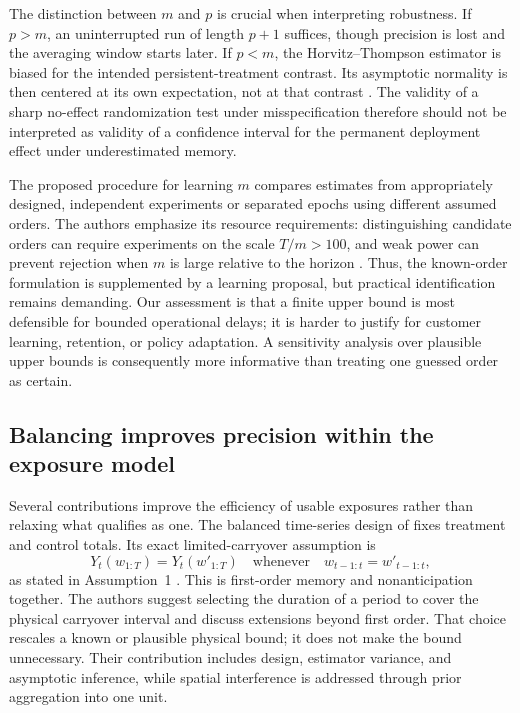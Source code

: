 The distinction between $m$ and $p$ is crucial when interpreting robustness. If $p>m$, an uninterrupted run of length $p+1$ suffices, though precision is lost and the averaging window starts later. If $p<m$, the Horvitz--Thompson estimator is biased for the intended persistent-treatment contrast. Its asymptotic normality is then centered at its own expectation, not at that contrast \citep[Section~4.3, p.~3768]{bojinov2023}. The validity of a sharp no-effect randomization test under misspecification therefore should not be interpreted as validity of a confidence interval for the permanent deployment effect under underestimated memory.

The proposed procedure for learning $m$ compares estimates from appropriately designed, independent experiments or separated epochs using different assumed orders. The authors emphasize its resource requirements: distinguishing candidate orders can require experiments on the scale $T/m>100$, and weak power can prevent rejection when $m$ is large relative to the horizon \citep[Section~6, pp.~3774--3775]{bojinov2023}. Thus, the known-order formulation is supplemented by a learning proposal, but practical identification remains demanding. Our assessment is that a finite upper bound is most defensible for bounded operational delays; it is harder to justify for customer learning, retention, or policy adaptation. A sensitivity analysis over plausible upper bounds is consequently more informative than treating one guessed order as certain.

\subsection{Balancing improves precision within the exposure model}

Several contributions improve the efficiency of usable exposures rather than relaxing what qualifies as one. The balanced time-series design of \citet{ni2022} fixes treatment and control totals. Its exact limited-carryover assumption is
\begin{equation}\label{eq:balanced-one-period}
Y_t(w_{1:T})=Y_t(w'_{1:T})
\quad\text{whenever}\quad w_{t-1:t}=w'_{t-1:t},
\end{equation}
as stated in Assumption~1 \citep[p.~2]{ni2022}. This is first-order memory and nonanticipation together. The authors suggest selecting the duration of a period to cover the physical carryover interval and discuss extensions beyond first order. That choice rescales a known or plausible physical bound; it does not make the bound unnecessary. Their contribution includes design, estimator variance, and asymptotic inference, while spatial interference is addressed through prior aggregation into one unit.

